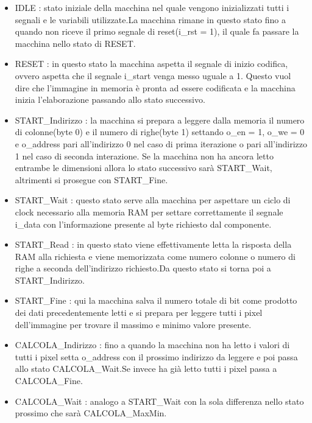 \begin{itemize}
    \item IDLE : stato iniziale della macchina nel quale vengono inizializzati tutti i segnali e le variabili utilizzate.La macchina rimane in questo stato fino a quando non riceve il primo segnale di reset(i\_rst = 1), il quale fa passare la macchina nello stato di RESET.
    
    \item RESET : in questo stato la macchina aspetta il segnale di inizio codifica, ovvero aspetta che il segnale i\_start venga messo uguale a 1. Questo vuol dire che l'immagine in memoria è pronta ad essere codificata e la macchina inizia l'elaborazione passando allo stato successivo.
    
    \item START\_Indirizzo : la macchina si prepara a leggere dalla memoria il numero di colonne(byte 0) e il numero di righe(byte 1) settando o\_en = 1, o\_we = 0 e o\_address pari all'indirizzo 0 nel caso di prima iterazione o pari all'indirizzo 1 nel caso di seconda interazione. Se la macchina non ha ancora letto entrambe le dimensioni allora lo stato successivo sarà START\_Wait, altrimenti si prosegue con START\_Fine.
    
    \item START\_Wait : questo stato serve alla macchina per aspettare un ciclo di clock necessario alla memoria RAM per settare correttamente il segnale i\_data con l'informazione presente al byte richiesto dal componente.
    
    \item START\_Read : in questo stato viene effettivamente letta la risposta della RAM alla richiesta e viene memorizzata come numero colonne o numero di righe a seconda dell'indirizzo richiesto.Da questo stato si torna poi a START\_Indirizzo.
    
    \item START\_Fine : qui la macchina salva il numero totale di bit come prodotto dei dati precedentemente letti e si prepara per leggere tutti i pixel dell'immagine per trovare il massimo e minimo valore presente.
    
    \item CALCOLA\_Indirizzo : fino a quando la macchina non ha letto i valori di tutti i pixel setta o\_address con il prossimo indirizzo da leggere e poi passa allo stato CALCOLA\_Wait.Se invece ha già letto tutti i pixel passa a CALCOLA\_Fine.
    
    \item CALCOLA\_Wait : analogo a START\_Wait con la sola differenza nello stato prossimo che sarà CALCOLA\_MaxMin.
    

\end{itemize}
